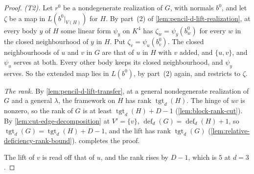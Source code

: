 \begin{proof}
  \emph{(T2).} Let $r^0$ be a nondegenerate realization of $G$, with
  normals $b^0$, and let $\zeta$ be a map in $L(b^0|_{V(H)})$ for $H$. By
  part~(2) of \cref{lem:pencil-d-lift-realization}, at every body $y$ of
  $H$ some linear form $\psi_y$ on $K^4$ has $\zeta_w = \psi_y(b^0_w)$
  for every $w$ in the closed neighbourhood of $y$ in $H$. Put
  $\zeta_v = \psi_u(b^0_v)$. The closed neighbourhoods of $u$ and $v$ in
  $G$ are that of $u$ in $H$ with $v$ added, and $\{u, v\}$, and
  $\psi_u$ serves at both. Every other body keeps its closed
  neighbourhood, and $\psi_y$ serves. So the extended map lies in
  $L(b^0)$, by part~(2) again, and restricts to $\zeta$.

  \emph{The rank.} By \cref{lem:pencil-d-lift-transfer}, at a general
  nondegenerate realization of $G$ and a general $\lambda$, the
  framework on $H$ has rank $\operatorname{tgt}_d(H)$. The hinge of $uv$
  is nonzero, so the rank of $G$ is at least
  $\operatorname{tgt}_d(H) + D - 1$ (\cref{lem:block-rank-cut}). By
  \cref{lem:cut-edge-decomposition} at $V' = \{v\}$,
  $\operatorname{def}_d(G) = \operatorname{def}_d(H) + 1$, so
  $\operatorname{tgt}_d(G) = \operatorname{tgt}_d(H) + D - 1$, and the
  lift has rank $\operatorname{tgt}_d(G)$
  (\cref{lem:relative-deficiency-rank-bound}).
   completes the proof.

  The lift of $v$ is read off that of $u$, and the rank rises by
  $D - 1$, which is $5$ at $d = 3$.
\end{proof}

